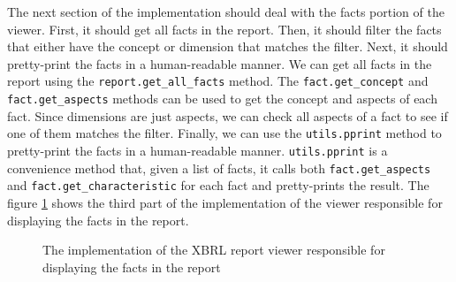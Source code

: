 The next section of the implementation should deal with the facts portion of the viewer.
First, it should get all facts in the report.
Then, it should filter the facts that either have the concept or dimension that matches the filter.
Next, it should pretty-print the facts in a human-readable manner.
We can get all facts in the report using the \texttt{report.get\_all\_facts} method.
The \texttt{fact.get\_concept} and \texttt{fact.get\_aspects} methods can be used to get the concept and aspects of each fact.
Since dimensions are just aspects, we can check all aspects of a fact to see if one of them matches the filter.
Finally, we can use the \texttt{utils.pprint} method to pretty-print the facts in a human-readable manner.
\texttt{utils.pprint} is a convenience method that, given a list of facts, it calls both \texttt{fact.get\_aspects} and \texttt{fact.get\_characteristic} for each fact and pretty-prints the result.
The figure \ref{fig:viewer_3} shows the third part of the implementation of the viewer responsible for displaying the facts in the report.

\begin{figure}[H]
    \centering
    \caption{The implementation of the XBRL report viewer responsible for displaying the facts in the report}
    
    \label{fig:viewer_3}
\end{figure}

